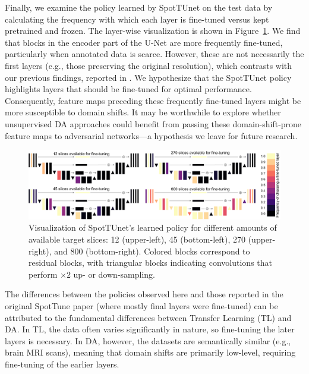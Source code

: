 Finally, we examine the policy learned by SpotTUnet on the test data by calculating the frequency with which each layer is fine-tuned versus kept pretrained and frozen. The layer-wise visualization is shown in Figure~\ref{fig:layerswise_template}. We find that blocks in the encoder part of the U-Net are more frequently fine-tuned, particularly when annotated data is scarce. However, these are not necessarily the first layers (e.g., those preserving the original resolution), which contrasts with our previous findings, reported in \cite{shirokikh2020first}. We hypothesize that the SpotTUnet policy highlights layers that should be fine-tuned for optimal performance. Consequently, feature maps preceding these frequently fine-tuned layers might be more susceptible to domain shifts. It may be worthwhile to explore whether unsupervised DA approaches \cite{kamnitsas2017unsupervised, zhao2021robust} could benefit from passing these domain-shift-prone feature maps to adversarial networks---a hypothesis we leave for future research.

\begin{landscape}
\begin{figure}[p]
	\centering
	\includegraphics[width=\linewidth]{Dissertation/Figures/2_mri/layerwise_template.pdf}
	\caption{Visualization of SpotTUnet's learned policy for different amounts of available target slices: 12 (upper-left), 45 (bottom-left), 270 (upper-right), and 800 (bottom-right). Colored blocks correspond to residual blocks, with triangular blocks indicating convolutions that perform $\times 2$ up- or down-sampling.}
	\label{fig:layerswise_template}
\end{figure}
\end{landscape}

The differences between the policies observed here and those reported in the original SpotTune paper \cite{guo2019spottune} (where mostly final layers were fine-tuned) can be attributed to the fundamental differences between Transfer Learning (TL) and DA. In TL, the data often varies significantly in nature, so fine-tuning the later layers is necessary. In DA, however, the datasets are semantically similar (e.g., brain MRI scans), meaning that domain shifts are primarily low-level, requiring fine-tuning of the earlier layers.



